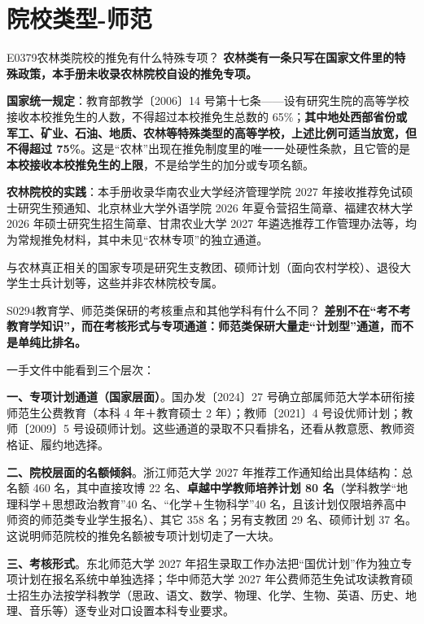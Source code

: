 \section{院校类型-师范}
\begin{qa}{E0379}{农林类院校的推免有什么特殊专项？}
\textbf{农林类有一条只写在国家文件里的特殊政策，本手册未收录农林院校自设的推免专项。}

\textbf{国家统一规定}：教育部教学〔2006〕14 号第十七条——设有研究生院的高等学校接收本校推免生的人数，不得超过本校推免生总数的 65\%；\textbf{其中地处西部省份或军工、矿业、石油、地质、农林等特殊类型的高等学校，上述比例可适当放宽，但不得超过 75\%}。这是“农林”出现在推免制度里的唯一一处硬性条款，且它管的是\textbf{本校接收本校推免生的上限}，不是给学生的加分或专项名额。

\textbf{农林院校的实践}：本手册收录华南农业大学经济管理学院 2027 年接收推荐免试硕士研究生预通知、北京林业大学外语学院 2026 年夏令营招生简章、福建农林大学 2026 年硕士研究生招生简章、甘肃农业大学 2027 年遴选推荐工作管理办法等，均为常规推免材料，其中未见“农林专项”的独立通道。

与农林真正相关的国家专项是研究生支教团、硕师计划（面向农村学校）、退役大学生士兵计划等，这些并非农林院校专属。
\end{qa}

\begin{qa}{S0294}{教育学、师范类保研的考核重点和其他学科有什么不同？}
\textbf{差别不在“考不考教育学知识”，而在考核形式与专项通道：师范类保研大量走“计划型”通道，而不是单纯比排名。}

一手文件中能看到三个层次：

\textbf{一、专项计划通道（国家层面）}。国办发〔2024〕27 号确立部属师范大学本研衔接师范生公费教育（本科 4 年＋教育硕士 2 年）；教师〔2021〕4 号设优师计划；教师〔2009〕5 号设硕师计划。这些通道的录取不只看排名，还看从教意愿、教师资格证、履约地选择。

\textbf{二、院校层面的名额倾斜}。浙江师范大学 2027 年推荐工作通知给出具体结构：总名额 460 名，其中直接攻博 22 名、\textbf{卓越中学教师培养计划 80 名}（学科教学“地理科学＋思想政治教育”40 名、“化学＋生物科学”40 名，且该计划仅限培养高中师资的师范类专业学生报名）、其它 358 名；另有支教团 29 名、硕师计划 37 名。这说明师范院校的推免名额被专项计划切走了一大块。

\textbf{三、考核形式}。东北师范大学 2027 年招生录取工作办法把“国优计划”作为独立专项计划在报名系统中单独选择；华中师范大学 2027 年公费师范生免试攻读教育硕士招生办法按学科教学（思政、语文、数学、物理、化学、生物、英语、历史、地理、音乐等）逐专业对口设置本科专业要求。
\end{qa}

